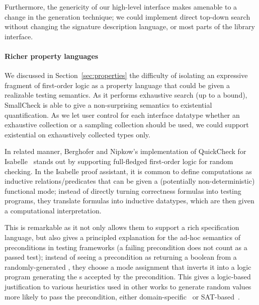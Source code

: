 Furthermore, the genericity of our high-level interface makes
 amenable to a change in the generation technique; we
could implement direct top-down search without changing the signature
description language, or most parts of the library interface.

\paragraph{Richer property languages}

We discussed in Section~\ref{sec:properties} the difficulty of
isolating an expressive fragment of first-order logic as a property
language that could be given a realizable testing semantics. As it
performs exhaustive search (up to a bound), SmallCheck is able to give
a non-surprising semantics to existential quantification. As we let
user control for each interface datatype whether an exhaustive
collection or a sampling collection should be used, we could
support existential on exhaustively collected types only.

In related manner, Berghofer and Nipkow's
implementation of QuickCheck for
Isabelle~\cite{DBLP:conf/sefm/BerghoferN04} stands out by supporting full-fledged
first-order logic for random checking. In the Isabelle proof
assistant, it is common to define computations as inductive
relations/predicates that can be given a (potentially
non-deterministic) functional mode; instead of directly turning
correctness formulas into testing programs, they translate formulas
into inductive datatypes, which are then given a computational
interpretation.

This is remarkable as it not only allows them to support a rich
specification language, but also gives a principled explanation for
the ad-hoc semantics of preconditions in testing frameworks (a failing
precondition does not count as a passed test); instead of seeing
a precondition  as returning a boolean from
a randomly-generated , they choose a mode assignment that
inverts it into a logic program generating the s accepted by
the precondition. This gives a logic-based justification to various
heuristics used in other works to generate random values more likely
to pass the precondition, either
domain-specific~\cite{DBLP:conf/tap/ClaessenS08} or
SAT-based~\cite{DBLP:conf/tap/AhnD10}.
